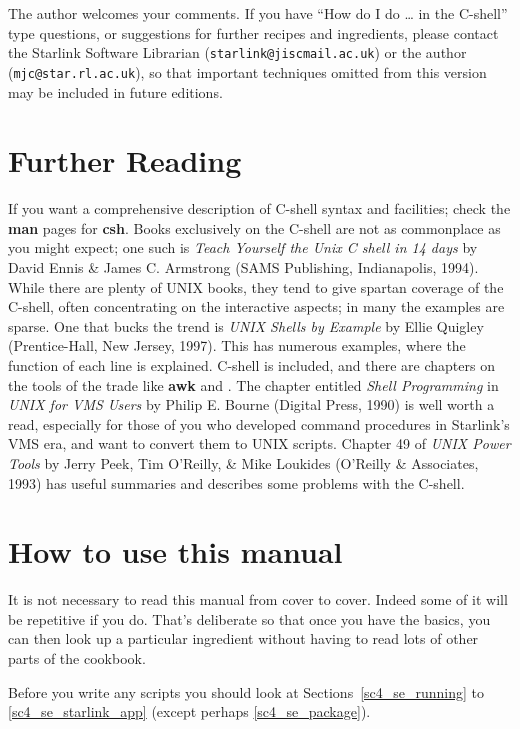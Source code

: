 \documentclass[twoside,11pt,nolof]{starlink}
\providecommand{\latexelsehtml}[2]{#1}
\begin{document}
The author welcomes your comments.  If you have ``How do I do \ldots
in the C-shell'' type questions, or suggestions for further recipes
and ingredients, please contact the Starlink Software Librarian
({\texttt{starlink@jiscmail.ac.uk}}) or the author ({\texttt{mjc@star.rl.ac.uk}}), so that
important techniques omitted from this version may be included in future
editions.

\section{Further Reading}

If you want a comprehensive description of C-shell syntax and
facilities; check the \textbf{man} pages for \textbf{csh}.  Books
exclusively on the C-shell are not as commonplace as you might expect;
one such is {\sl Teach Yourself the Unix C shell in 14 days} by David
Ennis \& James C. Armstrong (SAMS Publishing, Indianapolis, 1994).
While there are plenty of UNIX books, they tend to give spartan
coverage of the C-shell, often concentrating on the interactive
aspects; in many the examples are sparse.  One that bucks the trend is
{\sl UNIX Shells by Example} by Ellie Quigley (Prentice-Hall, New
Jersey, 1997).  This has numerous examples, where the function of each
line is explained.  C-shell is included, and there are chapters on the
tools of the trade like \textbf{awk} and .  The chapter entitled \textit{Shell
Programming\/} in {\sl UNIX for VMS Users\/} by Philip E. Bourne
(Digital Press, 1990) is well worth a read, especially for those of
you who developed command procedures in Starlink's VMS era, and want
to convert them to UNIX scripts.  Chapter 49 of {\sl UNIX Power Tools}
by Jerry Peek, Tim O'Reilly, \& Mike Loukides (O'Reilly \& Associates,
1993) has useful summaries and describes some problems with the
C-shell.

\newpage

\section{How to use this manual}

It is not necessary to read this manual from cover to cover.  Indeed
some of it will be repetitive if you do.  That's deliberate so that
once you have the basics, you can then look up a particular ingredient
without having to read lots of other parts of the cookbook.

Before you write any scripts you should look at
\latexelsehtml{Sections~\ref{sc4_se_running} to \ref{sc4_se_starlink_app}
(except perhaps \ref{sc4_se_package})}{\htmlref{Running a
script}{sc4_se_running}, \htmlref{Some simple examples}{sc4_se_simple},
\htmlref{Shell Variables}{sc4_se_variables}, and
\htmlref{Executing a Starlink Application}{sc4_se_starlink_app}}.
\end{document}
